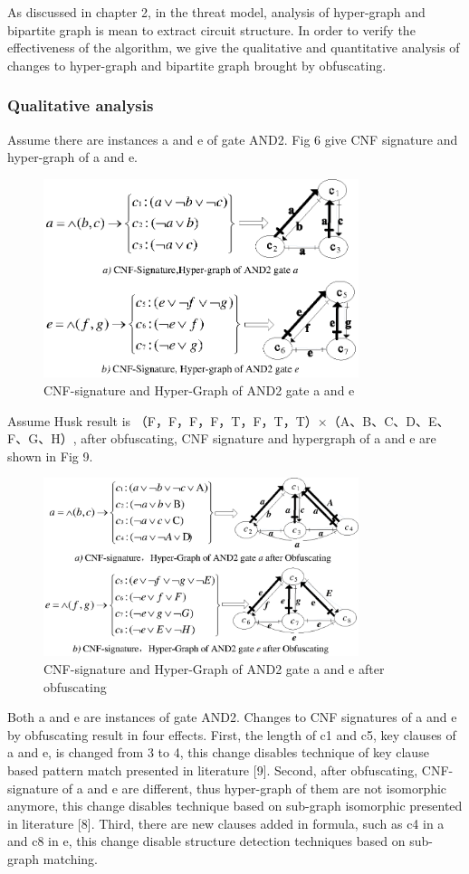 \documentclass[runningheads,a4paper]{llncs}
\begin{document}
As discussed in chapter 2, in the threat model, analysis of hyper-graph and bipartite graph is mean to extract circuit structure. In order to verify the effectiveness of the algorithm, we give the qualitative and quantitative analysis of changes to hyper-graph and bipartite graph brought by obfuscating.
\subsubsection{Qualitative analysis}

\setlength{\parindent}{2em} 
Assume there are instances a and e of gate AND2. Fig 6 give CNF signature and hyper-graph of a and e.
\begin{figure}
\centering
\includegraphics[width=9.2cm]{a6}
\caption{CNF-signature and Hyper-Graph of AND2 gate a and e}
\end{figure}
Assume Husk result is {（F，F，F，F，T，F，T，T）×（A、B、C、D、E、F、G、H）}, after obfuscating, CNF signature and hypergraph of a and e are shown in Fig 9.
\begin{figure}
\centering
\includegraphics[width=9.2cm]{a7}
\caption{CNF-signature and Hyper-Graph of AND2 gate a and e after obfuscating}
\end{figure}
Both a and e are instances of gate AND2. Changes to CNF signatures of a and e by obfuscating result in four effects. First, the length of c1 and c5, key clauses of a and e, is changed from 3 to 4, this change disables technique of key clause based pattern match presented in literature [9]. Second, after obfuscating, CNF-signature of a and e are different, thus hyper-graph of them are not isomorphic anymore, this change disables technique based on sub-graph isomorphic presented in literature [8]. Third, there are new clauses added in formula, such as c4 in a and c8 in e, this change disable structure detection techniques based on sub-graph matching. 
\end{document}
